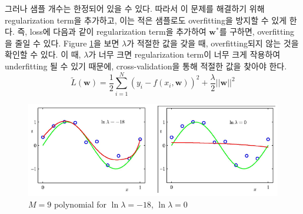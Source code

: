 \documentclass[twoside]{article}
\begin{document}
그러나 샘플 개수는 한정되어 있을 수 있다. 따라서 이 문제를 해결하기 위해 regularization term을 추가하고, 이는 적은 샘플로도 overfitting을 방지할 수 있게 한다. 즉, loss에 다음과 같이 regularization term을 추가하여 $\mathbf{w}^*$를 구하면, overfitting을 줄일 수 있다. Figure \ref{fig:13-6}을 보면 $\lambda$가 적절한 값을 갖을 때, overfitting되지 않는 것을 확인할 수 있다. 이 때, $\lambda$가 너무 크면 regularization term이 너무 크게 작용하여 underfitting 될 수 있기 때문에, cross-validation을 통해 적절한 값을 찾아야 한다.
$$\tilde{L}(\mathbf{w}) = \frac{1}{2} \sum_{i=1}^{N} (y_i - f(x_i, \mathbf{w}))^2 + \frac{\lambda}{2} |\!| \mathbf{w} |\!|^2$$

\begin{figure}[h]
	\centering
	\includegraphics[width=0.7\linewidth]{13-6}
	\caption{$M=9$ polynomial for $\ln \lambda=-18$, $\ln \lambda=0$}
	\label{fig:13-6}
\end{figure}
\end{document}
